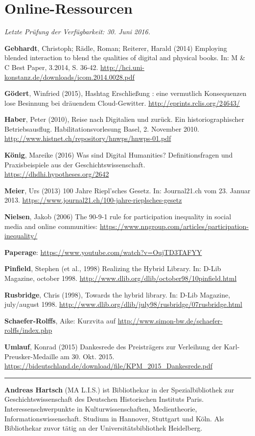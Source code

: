 \documentclass[a4paper,
fontsize=11pt,
oneside,
numbers=noperiodatend,
parskip=half-,
bibliography=totoc,
final
]{scrartcl}
\begin{document}
\section*{Online-Ressourcen}\label{online-ressourcen}

\emph{Letzte Prüfung der Verfügbarkeit: 30. Juni 2016.}

\textbf{Gebhardt}, Christoph; Rädle, Roman; Reiterer, Harald (2014)
Employing blended interaction to blend the qualities of digital and
physical books. In: M \& C Best Paper, 3.2014, S. 36-42.
\url{http://hci.uni-konstanz.de/downloads/icom.2014.0028.pdf}

\textbf{Gödert}, Winfried (2015), Hashtag Erschließung : eine vermutlich
Konsequenzen lose Besinnung bei dräuendem Cloud-Gewitter.
\url{http://eprints.rclis.org/24643/}

\textbf{Haber}, Peter (2010), Reise nach Digitalien und zurück. Ein
historiographischer Betriebsausflug. Habilitationsvorlesung Basel, 2.
November 2010. \url{http://www.histnet.ch/repository/hnwps/hnwps-01.pdf}

\textbf{König}, Mareike (2016) Was sind Digital Humanities?
Definitionsfragen und Praxisbeispiele aus der Geschichtswissenschaft.
\url{https://dhdhi.hypotheses.org/2642}

\textbf{Meier}, Urs (2013) 100 Jahre Riepl'sches Gesetz. In:
Journal21.ch vom 23. Januar 2013.
\url{https://www.journal21.ch/100-jahre-rieplsches-gesetz}

\textbf{Nielsen}, Jakob (2006) The 90-9-1 rule for participation
inequality in social media and online communities:
\url{https://www.nngroup.com/articles/participation-inequality/}

\textbf{Paperage}: \url{https://www.youtube.com/watch?v=OujTD3TAFYY}

\textbf{Pinfield}, Stephen (et al., 1998) Realizing the Hybrid Library.
In: D-Lib Magazine, october 1998.
\url{http://www.dlib.org/dlib/october98/10pinfield.html}

\textbf{Rusbridge}, Chris (1998), Towards the hybrid library. In: D-Lib
Magazine, july/august 1998.
\url{http://www.dlib.org/dlib/july98/rusbridge/07rusbridge.html}

\textbf{Schaefer-Rolffs}, Aike: Kurzvita auf
\url{http://www.simon-bw.de/schaefer-rolffs/index.php}

\textbf{Umlauf}, Konrad (2015) Dankesrede des Preisträgers zur
Verleihung der Karl-Preusker-Medaille am 30. Okt. 2015.
\url{https://bideutschland.de/download/file/KPM_2015_Dankesrede.pdf}

\begin{center}\rule{0.5\linewidth}{\linethickness}\end{center}

\textbf{Andreas Hartsch} (MA L.I.S.) ist Bibliothekar in der
Spezialbibliothek zur Geschichtswissenschaft des Deutschen Historischen
Instituts Paris. Interessenschwerpunkte in Kulturwissenschaften,
Medientheorie, Informationswissenschaft. Studium in Hannover, Stuttgart
und Köln. Als Bibliothekar zuvor tätig an der Universitätsbibliothek
Heidelberg.
\end{document}
